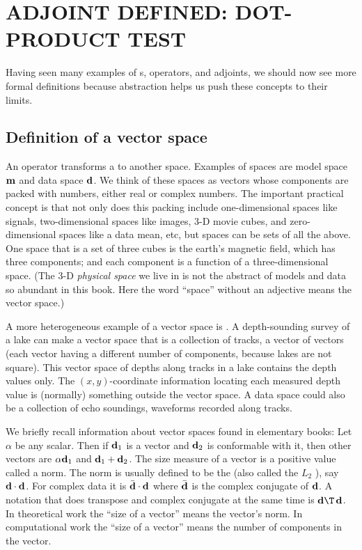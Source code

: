 

\section{ADJOINT DEFINED: DOT-PRODUCT TEST}

Having seen many examples of s, operators, and adjoints,
we should now see more formal definitions
because abstraction
helps us push these concepts to their limits.

\subsection{Definition of a vector space}
An operator transforms a  to another space.
Examples of spaces are model space $\bold m$
and data space $\bold d$.
We think of these spaces as vectors
whose components are packed with numbers,
either real or complex numbers.
The important practical concept is that
not only does this packing include one-dimensional spaces like signals,
two-dimensional spaces like images, 3-D movie cubes,
and zero-dimensional spaces like a data mean, etc,
but spaces can be sets of all the above.
One space that is a set of three cubes is
the earth's magnetic field, which has three components;
and each component is a function of a three-dimensional space.
(The 3-D {\em  physical space} we live in is not
the abstract {\em  {}}
of models and data so abundant in this book.
Here the word ``space'' without an adjective means the vector space.)
\par
A more heterogeneous example of a vector space is .
A depth-sounding survey of a lake can make a vector space that is
a collection of tracks,
a vector of vectors
(each vector having a different number of components,
because lakes are not square).
This vector space of depths along tracks in a lake
contains the depth values only.
The $(x,y)$-coordinate information
locating each measured depth value
is (normally) something outside the vector space.
A data space could also be a collection of echo soundings,
waveforms recorded along tracks.

\par
We briefly recall information about vector spaces found in elementary books:
Let $\alpha$ be any scalar.
Then if $\bold d_1$ is a vector and $\bold d_2$ is conformable
with it, then other vectors are
$\alpha \bold d_1$ and $\bold d_1 + \bold d_2$.
The size measure of a vector is a positive value called a norm.
The norm is usually defined to be the 
(also called the $L_2$ ), say $\bold d \cdot \bold d$.
For complex data it is
$\bar{\bold{d}} \cdot \bold{d}$
where $\bar{\bold{d}}$ is the complex conjugate of $\bold{d}$.
A notation that does transpose and complex conjugate at the same time is $\bold d\T\,\bold d$.
In theoretical work the ``size of a vector'' means the vector's norm.
In computational work the ``size of a vector'' means the
number of components in the vector.

